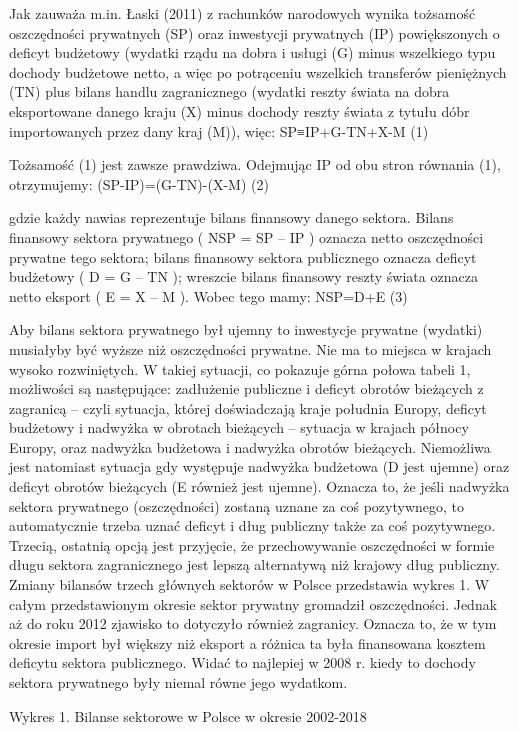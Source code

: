 \documentclass[
]{book}
\begin{document}
Jak zauważa m.in. Łaski (2011) z rachunków narodowych wynika tożsamość oszczędności prywatnych (SP) oraz inwestycji prywatnych (IP) powiększonych o deficyt budżetowy (wydatki rządu na dobra i usługi (G) minus wszelkiego typu dochody budżetowe netto, a więc po potrąceniu wszelkich transferów pieniężnych (TN) plus bilans handlu zagranicznego (wydatki reszty świata na dobra eksportowane danego kraju (X) minus dochody reszty świata z tytułu dóbr importowanych przez dany kraj (M)), więc:
SP≡IP+G-TN+X-M (1)

Tożsamość (1) jest zawsze prawdziwa. Odejmując IP od obu stron równania (1), otrzymujemy:
(SP-IP)=(G-TN)-(X-M) (2)

gdzie każdy nawias reprezentuje bilans finansowy danego sektora. Bilans finansowy sektora prywatnego ( NSP = SP -- IP ) oznacza netto oszczędności prywatne tego sektora; bilans finansowy sektora publicznego oznacza deficyt budżetowy ( D = G -- TN ); wreszcie bilans finansowy reszty świata oznacza netto eksport ( E = X -- M ). Wobec tego mamy:
NSP=D+E (3)

Aby bilans sektora prywatnego był ujemny to inwestycje prywatne (wydatki) musiałyby być wyższe niż oszczędności prywatne. Nie ma to miejsca w krajach wysoko rozwiniętych. W takiej sytuacji, co pokazuje górna połowa tabeli 1, możliwości są następujące: zadłużenie publiczne i deficyt obrotów bieżących z zagranicą -- czyli sytuacja, której doświadczają kraje południa Europy, deficyt budżetowy i nadwyżka w obrotach bieżących -- sytuacja w krajach północy Europy, oraz nadwyżka budżetowa i nadwyżka obrotów bieżących. Niemożliwa jest natomiast sytuacja gdy występuje nadwyżka budżetowa (D jest ujemne) oraz deficyt obrotów bieżących (E również jest ujemne). Oznacza to, że jeśli nadwyżka sektora prywatnego (oszczędności) zostaną uznane za coś pozytywnego, to automatycznie trzeba uznać deficyt i dług publiczny także za coś pozytywnego. Trzecią, ostatnią opcją jest przyjęcie, że przechowywanie oszczędności w formie długu sektora zagranicznego jest lepszą alternatywą niż krajowy dług publiczny.
Zmiany bilansów trzech głównych sektorów w Polsce przedstawia wykres 1. W całym przedstawionym okresie sektor prywatny gromadził oszczędności. Jednak aż do roku 2012 zjawisko to dotyczyło również zagranicy. Oznacza to, że w tym okresie import był większy niż eksport a różnica ta była finansowana kosztem deficytu sektora publicznego. Widać to najlepiej w 2008 r. kiedy to dochody sektora prywatnego były niemal równe jego wydatkom.

Wykres 1. Bilanse sektorowe w Polsce w okresie 2002-2018
\end{document}
